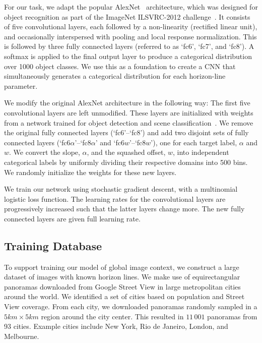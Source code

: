 For our task, we adapt the popular
AlexNet~\cite{krizhevsky2012imagenet} architecture, which was designed
for object recognition as part of the ImageNet ILSVRC-2012
challenge~\cite{russakovsky2015imagenet}. It consists of five
convolutional layers, each followed by a non-linearity (rectified
linear unit), and occasionally interspersed with pooling and local
response normalization. This is followed by three fully connected
layers (referred to as `fc6', `fc7', and `fc8'). A softmax is applied
to the final output layer to produce a categorical distribution over
1000 object classes.  We use this as a foundation to create a CNN that
simultaneously generates a categorical distribution for each
horizon-line parameter.

We modify the original AlexNet architecture in the following way: The
first five convolutional layers are left unmodified. These layers are
initialized with weights from a network trained for object detection
and scene classification~\cite{zhou2014places}. We remove the original
fully connected layers (`fc6'--`fc8') and add two disjoint sets of
fully connected layers (`fc6$\alpha$'--`fc8$\alpha$' and
`fc6$w$'--`fc8$w$'), one for each target label, $\alpha$ and $w$.  We
convert the slope, $\alpha$, and the squashed offset, $w$, into
independent categorical labels by uniformly dividing their respective
domains into 500 bins.  We randomly initialize the weights for these
new layers.

We train our network using stochastic gradient descent, with a
multinomial logistic loss function. The learning rates for the
convolutional layers are progressively increased such that the latter
layers change more. The new fully connected layers are given full
learning rate.

\subsection{Training Database}
\label{sec:dataset}
To support training our model of global image context, we construct a
large dataset of images with known horizon lines. We make use of
equirectangular panoramas downloaded from Google Street View in large
metropolitan cities around the world. We identified a set of cities
based on population and Street View coverage. From each city, we
downloaded panoramas randomly sampled in a $5km \times 5km$ region
around the city center. This resulted in $11\,001$ panoramas from 93
cities. Example cities include New York, Rio de Janeiro, London, and
Melbourne.

